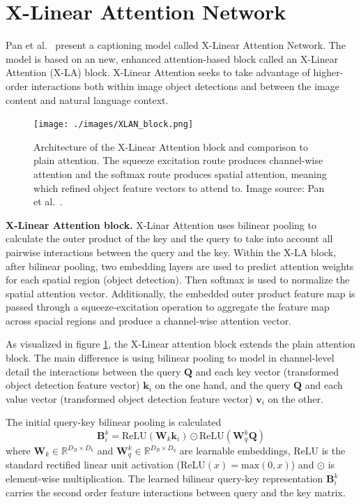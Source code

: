 \documentclass[english,twoside,openright]{HYgraduMLDS}
\newcommand{\matr}[1]{\bm{#1}}
\newcommand{\vect}[1]{\bm{#1}}
\begin{document}
\section{X-Linear Attention Network}
Pan et al.~\cite{XLinearAN} present a captioning model called X-Linear Attention Network. The model is based on an new, enhanced attention-based block called an X-Linear Attention (X-LA) block. X-Linear Attention seeks to take advantage of higher-order interactions both within image object detections and between the image content and natural language context. 

\begin{figure}[h] 
\centering
\texttt{[image: ./images/XLAN\_block.png]}
\caption{Architecture of the X-Linear Attention block and comparison to plain attention. The squeeze excitation route produces channel-wise attention and the softmax route produces spatial attention, meaning which refined object feature vectors to attend to. Image source: Pan et al.~\cite{XLinearAN}.}
\label{fig:XLAN_block} 
\end{figure}

\textbf{X-Linear Attention block.} X-Linar Attention uses bilinear pooling to calculate the outer product of the key and the query to take into account all pairwise interactions between the query and the key. Within the X-LA block, after bilinear pooling, two embedding layers are used to predict attention weights for each spatial region (object detection). Then softmax is used to normalize the spatial attention vector. Additionally, the embedded outer product feature map is passed through a squeeze-excitation operation to aggregate the feature map across spacial regions and produce a channel-wise attention vector. 

As visualized in figure \ref{fig:XLAN_block}, the X-Linear attention block extends the plain attention block. The main difference is using bilinear pooling to model in channel-level detail the interactions between the query $\matr{Q}$ and each key vector (transformed object detection feature vector) $\vect{k}_i$ on the one hand, and the query $\matr{Q}$ and each value vector (transformed object detection feature vector) $\vect{v}_i$ on the other. 

The initial query-key bilinear pooling is calculated 
\begin{equation}
\matr{B}_i^k = \text{ReLU}(\matr{W}_k \vect{k}_i) \odot \text{ReLU}(\matr{W}^k_q \matr{Q})
\end{equation}
%
where $\matr{W}_k \in \mathbb{R}^{D_B \times D_k}$ and $\matr{W}^k_q \in \mathbb{R}^{D_B \times D_q}$ are learnable embeddings, ReLU is the standard rectified linear unit activation ($\text{ReLU}(x) = \text{max}(0,x)$) and $\odot$ is element-wise multiplication. The learned bilinear query-key representation $\matr{B}_i^k$ carries the second order feature interactions between query and the key matrix.
\end{document}
